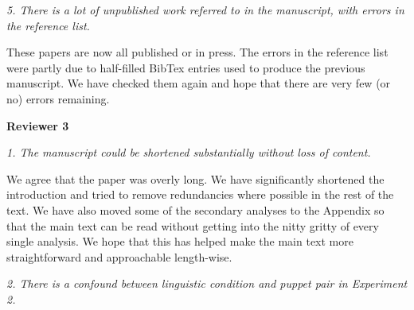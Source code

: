 \documentclass[11pt,a4paper]{letter} %
\begin{document}
\begin{letter}{}
\smallskip

\noindent \textit{5. There is a lot of unpublished work referred to in the manuscript, with errors in the reference list.}

\noindent These papers are now all published or in press. The errors in the reference list were partly due to half-filled BibTex entries used to produce the previous manuscript. We have checked them again and hope that there are very few (or no) errors remaining.

\bigskip

\noindent \textbf{Reviewer 3}

\noindent \textit{1. The manuscript could be shortened substantially without loss of content.}

\noindent We agree that the paper was overly long. We have significantly shortened the introduction and tried to remove redundancies where possible in the rest of the text. We have also moved some of the secondary analyses to the Appendix so that the main text can be read without getting into the nitty gritty of every single analysis. We hope that this has helped make the main text more straightforward and approachable length-wise.

\smallskip

\noindent \textit{2. There is a confound between linguistic condition and puppet pair in Experiment 2.}


\end{letter}
\end{document}
